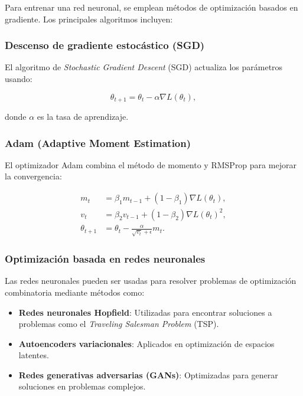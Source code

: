 \begin{itemize}
		Para entrenar una red neuronal, se emplean métodos de optimización basados en gradiente. Los principales algoritmos incluyen:
		
		\subsubsection{Descenso de gradiente estocástico (SGD)}
		
		El algoritmo de \textit{Stochastic Gradient Descent} (SGD) actualiza los parámetros usando:
		
		\begin{equation}
			\theta_{t+1} = \theta_t - \alpha \nabla L(\theta_t),
		\end{equation}
		
		donde \( \alpha \) es la tasa de aprendizaje.
		
		\subsubsection{Adam (Adaptive Moment Estimation)}
		
		El optimizador Adam combina el método de momento y RMSProp para mejorar la convergencia:
		
		\begin{align}
			m_t &= \beta_1 m_{t-1} + (1 - \beta_1) \nabla L(\theta_t), \\
			v_t &= \beta_2 v_{t-1} + (1 - \beta_2) \nabla L(\theta_t)^2, \\
			\theta_{t+1} &= \theta_t - \frac{\alpha}{\sqrt{v_t} + \epsilon} m_t.
		\end{align}
		
		\subsubsection{Optimización basada en redes neuronales}
		
		Las redes neuronales pueden ser usadas para resolver problemas de optimización combinatoria mediante métodos como:
		
		\begin{itemize}
			\item \textbf{Redes neuronales Hopfield}: Utilizadas para encontrar soluciones a problemas como el \textit{Traveling Salesman Problem} (TSP).
			\item \textbf{Autoencoders variacionales}: Aplicados en optimización de espacios latentes.
			\item \textbf{Redes generativas adversarias (GANs)}: Optimizadas para generar soluciones en problemas complejos.
		\end{itemize}
		

\end{itemize}
